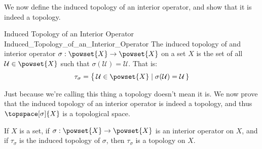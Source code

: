         We now define the induced topology of an interior operator, and show
        that it is indeed a topology.
        \begin{fdefinition}{Induced Topology of an Interior Operator}
                           {Induced_Topology_of_an_Interior_Operator}
            The induced topology of and interior operator
            $\sigma:\powset{X}\rightarrow\powset{X}$ on a set $X$ is the set
            of all $\mathcal{U}\in\powset{X}$ such that
            $\sigma(\mathcal{U})=\mathcal{U}$. That is:
            \begin{equation*}
                \tau_{\sigma}=\big\{\,\mathcal{U}\in\powset{X}\;|\;
                    \sigma(\mathcal{U})=\mathcal{U}\,\}
            \end{equation*}
        \end{fdefinition}
        Just because we're calling this thing a topology doesn't mean it is.
        We now prove that the induced topology of an interior operator is
        indeed a topology, and thus $\topspace[\sigma]{X}$ is a topological
        space.
        \begin{theorem}
            \label{thm:Top_Induced_by_Int_Op_is_Top}%
            If $X$ is a set, if $\sigma:\powset{X}\rightarrow\powset{X}$ is
            an interior operator on $X$, and if $\tau_{\sigma}$ is the
            induced topology of $\sigma$, then $\tau_{\sigma}$ is a topology
            on $X$.
        \end{theorem}
